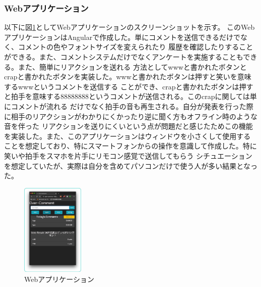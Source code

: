\documentclass[a4j,twocolumn]{ujarticle}
\begin{document}
\subsubsection{Webアプリケーション}
以下に図\ref{web-app}としてWebアプリケーションのスクリーンショットを示す。
このWebアプリケーションはAngularで作成した。単にコメントを送信できるだけでなく、コメントの色やフォントサイズを変えられたり
履歴を確認したりすることができる。また、コメントシステムだけでなくアンケートを実施することもできる。また、簡単にリアクションを送れる
方法としてwwwと書かれたボタンとcrapと書かれたボタンを実装した。wwwと書かれたボタンは押すと笑いを意味するwwwというコメントを送信する
ことができ、crapと書かれたボタンは押すと拍手を意味する88888888というコメントが送信される。このcrapに関しては単にコメントが流れる
だけでなく拍手の音も再生される。自分が発表を行った際に相手のリアクションがわかりにくかったり逆に聞く方もオフライン時のような音を伴った
リアクションを送りにくいという点が問題だと感じたためこの機能を実装した。また、このアプリケーションはウィンドウを小さくして使用する
ことを想定しており、特にスマートフォンからの操作を意識して作成した。特に笑いや拍手をスマホを片手にリモコン感覚で送信してもらう
シチュエーションを想定していたが、実際は自分を含めてパソコンだけで使う人が多い結果となった。

\begin{figure}[h]
\centering
\includegraphics[width=3cm]{../assets/web-app.jpg}
\caption{Webアプリケーション}
\label{web-app}
\end{figure}



\end{document}
